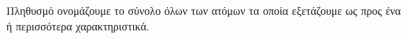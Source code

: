 Πληθυσμό ονομάζουμε το σύνολο όλων των ατόμων τα οποία εξετάζουμε ως προς ένα ή περισσότερα χαρακτηριστικά.

